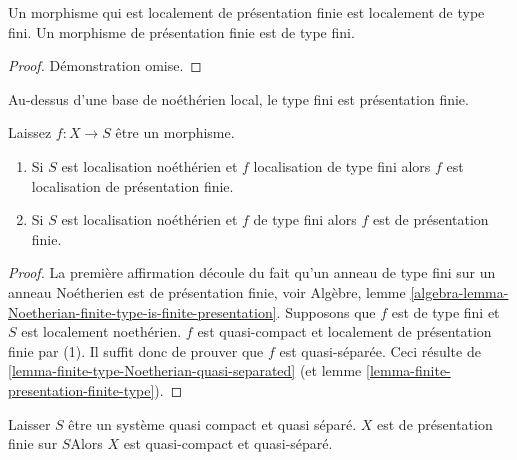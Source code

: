 \begin{lemma}

\label{lemma-finite-presentation-finite-type}
Un morphisme qui est localement de présentation finie est localement de type fini. Un morphisme de présentation finie est de type fini.
\end{lemma}

\begin{proof}
Démonstration omise.
\end{proof}

\begin{lemma}

\label{lemma-noetherian-finite-type-finite-presentation}

\begin{slogan}
Au-dessus d'une base de noéthérien local, le type fini est présentation finie.
\end{slogan}
Laissez $f : X \to S$ être un morphisme.
\begin{enumerate}
\item Si $S$ est localisation noéthérien et $f$ localisation de type fini alors $f$ est localisation de présentation finie.
\item Si $S$ est localisation noéthérien et $f$ de type fini alors $f$ est de présentation finie.
\end{enumerate}

\end{lemma}

\begin{proof}

La première affirmation découle du fait qu'un anneau de type fini sur un anneau Noétherien est de présentation finie, voir Algèbre, lemme \ref{algebra-lemma-Noetherian-finite-type-is-finite-presentation}. Supposons que $f$ est de type fini et $S$ est localement noethérien. $f$ est quasi-compact et localement de présentation finie par (1). Il suffit donc de prouver que $f$ est quasi-séparée. Ceci résulte de \ref{lemma-finite-type-Noetherian-quasi-separated}
(et lemme \ref{lemma-finite-presentation-finite-type}).

\end{proof}

\begin{lemma}

\label{lemma-finite-presentation-quasi-compact-quasi-separated}

Laisser $S$ être un système quasi compact et quasi séparé. $X$ est de présentation finie sur $S$Alors $X$ est quasi-compact et quasi-séparé.

\end{lemma}

